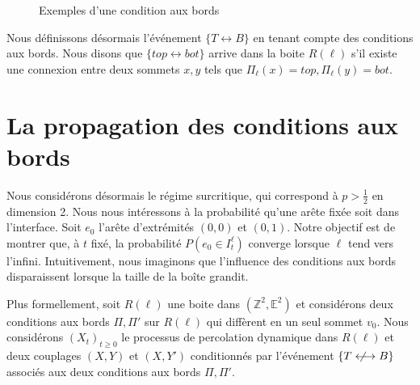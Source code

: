 \documentclass[titlepage,a4paper,12pt]{article}
\newcounter{prop}
\newcounter{cor}
\newcommand{\nlongleftrightarrow}{\longleftrightarrow \kern-15pt\not \kern15pt}
\begin{document}
\begin{figure}[h]
\center
{}
\caption{Exemples d'une condition aux bords}
\end{figure}

Nous définissons désormais l'événement $\{T\longleftrightarrow B\}$ en tenant compte des conditions aux bords. Nous disons que $\{top\longleftrightarrow bot\}$ arrive dans la boite $R(\ell)$ s'il existe une connexion entre deux sommets $x,y$ tels que $\Pi_{\ell}(x) = top, \Pi_{\ell}(y) = bot$.
\section{La propagation des conditions aux bords}
Nous considérons désormais le régime surcritique, qui correspond à $p>\frac{1}{2}$ en dimension 2. Nous nous intéressons à la probabilité qu'une arête fixée soit dans l'interface. Soit $e_0$ l'arête d'extrémités $(0,0)$ et $(0,1)$. Notre objectif est de montrer que, à $t$ fixé, la probabilité $P(e_0 \in I^\ell_t)$ converge lorsque $\ell$ tend vers l'infini. Intuitivement, nous imaginons que l'influence des conditions aux bords disparaissent lorsque la taille de la boîte grandit. %

Plus formellement, soit $R(\ell)$ une boite dans $(\mathbb{Z}^2,\mathbb{E}^2)$ et considérons deux conditions aux bords $\Pi, \Pi'$ sur $R(\ell)$ qui diffèrent en un seul sommet $v_0$. Nous considérons $(X_t)_{t\geqslant 0}$ le processus de percolation dynamique dans $R(\ell)$ et deux couplages $(X,Y)$ et $(X,Y')$ conditionnés par l'événement $\{T\nlongleftrightarrow B\}$ associés aux deux conditions aux bords $\Pi, \Pi'$.
\end{document}
